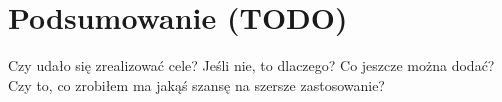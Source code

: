 \chapter{Podsumowanie (TODO)}
Czy udało się zrealizować cele? Jeśli nie, to dlaczego? Co jeszcze można dodać? Czy to, co zrobiłem ma jakąś szansę na szersze zastosowanie?

%

